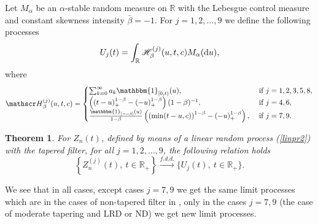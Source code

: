 \documentclass[12pt]{article}
\def\bbr{{\mathbb R}}
\def\a{\alpha}
\def\b{\beta}
\def\H{{\mathscr H}}
\def\fdd{\stackrel{f.d.d.}{\longrightarrow}}
\newcommand{\RR}{\mathbb{R} }
\newcommand{\du}{{\rm d}u }
\newcommand{\ind}[1]{\mathbbm{1}_{#1}}
\theoremstyle{plain}
\newtheorem{teo}{Theorem}
\theoremstyle{definition}
\begin{document}
Let $ M_\a$ be an $\a$-stable random measure on $\bbr$ with the Lebesgue control measure and constant skewness intensity ${\bar \b}=-1$. For $j=1, 2, \dots, 9$ we define the following processes
\begin{equation}\label{Udef}
U_{j}(t)=\int_{\RR}\H^{(j)}_{\b}(u,t,c) M_\a(\du),
\end{equation}
where
\begin{equation}\label{Hdef}
\H_{\b}^{(j)}(u,t,c)=\begin{cases}
\sum_{k=0}^{\infty}a_k\ind{[0,t)}(u), &\text{ if } j=1,2,3,5,8,\\
\left ((t-u)_+^{1-\b}-(-u)_+^{1-\b}\right ) (1-\b)^{-1}, &\text{ if } j=4,6, \\
\frac{\ind{[-c, t]}(u)}{1-\b}\left (\left (\min (t-u, c)\right )^{1-\b}-(-u)_+^{1-\b}\right ), &\text{ if } j=7,9.\\
\end{cases}
\end{equation}




\begin{teo}\label{thm3} For $Z_n(t)$, defined by means of a linear random process (\ref{linpr2}) with the tapered  filter, for all  $j=1, 2, \dots, 9$,
the following relation holds
\begin{equation}\label{main}
\left \{Z_{n}^{(j)}(t), \ t \in \bbr_+\right \}\fdd \{U_{j}(t),  \ t \in \bbr_+ \}.
\end{equation}
\end{teo}

We see that in all cases, except cases $j=7, 9$ we get the same limit processes which  are in the cases of non-tapered filter in \cite{Astrauskas}, only in the cases $j=7,9$ (the case of moderate tapering and LRD or ND) we get new limit processes.
\end{document}
